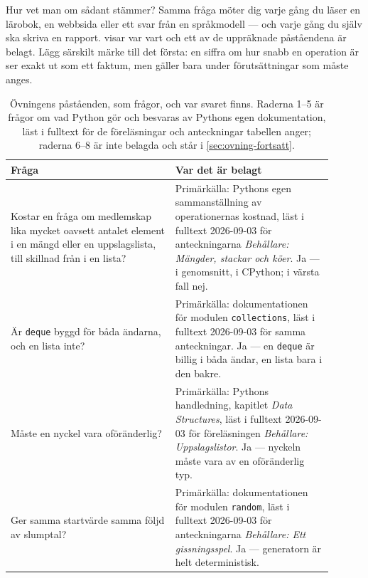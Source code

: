 Hur vet man om sådant stämmer?  Samma fråga möter dig varje gång du
läser en lärobok, en webbsida eller ett svar från en språkmodell --- och
varje gång du själv ska skriva en rapport.
 visar var vart och ett av de uppräknade
påståendena är belagt.  Lägg särskilt märke till det första: en siffra om
hur snabb en operation är ser exakt ut som ett faktum, men gäller bara
under förutsättningar som måste anges.

\begin{table}[!htb]
  \centering
  \caption{Övningens påståenden, som frågor, och var svaret finns.
    Raderna 1--5 är frågor om vad Python gör och besvaras av Pythons egen
    dokumentation, läst i fulltext för de föreläsningar och anteckningar
    tabellen anger;
    raderna 6--8
    är inte belagda och står i
    \cref{sec:ovning-fortsatt}.}
  \label{tab:ovning-pastaenden}
  \begin{tabular}{@{}p{0.46\linewidth}p{0.44\linewidth}@{}}
    \toprule
    Fråga & Var det är belagt \\
    \midrule
    Kostar en fråga om medlemskap lika mycket oavsett antalet element i
    en mängd eller en uppslagslista, till skillnad från i en lista?
      & Primärkälla: Pythons egen sammanställning av operationernas
        kostnad, läst i fulltext 2026-09-03 för anteckningarna
        \emph{Behållare: Mängder, stackar och köer}.  Ja --- i
        genomsnitt, i CPython; i värsta fall nej. \\
    Är \texttt{deque} byggd för båda ändarna, och en lista
    inte?
      & Primärkälla: dokumentationen för modulen
        \texttt{collections}, läst i fulltext 2026-09-03 för
        samma anteckningar.  Ja --- en \texttt{deque} är
        billig i båda ändar, en lista bara i den bakre. \\
    Måste en nyckel vara oföränderlig?
      & Primärkälla: Pythons handledning, kapitlet \emph{Data
        Structures}, läst i fulltext 2026-09-03 för föreläsningen
        \emph{Behållare: Uppslagslistor}.  Ja --- nyckeln måste vara av
        en oföränderlig typ. \\
    Ger samma startvärde samma följd av slumptal?
      & Primärkälla: dokumentationen för modulen
        \texttt{random}, läst i fulltext 2026-09-03 för
        anteckningarna \emph{Behållare: Ett gissningsspel}.  Ja ---
        generatorn är helt deterministisk. \\

\end{tabular}
\end{table}
